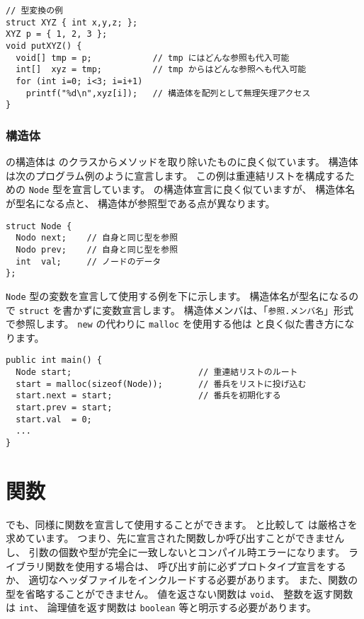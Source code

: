 \begin{mylist}
\begin{verbatim}
// 型変換の例
struct XYZ { int x,y,z; };
XYZ p = { 1, 2, 3 };
void putXYZ() {
  void[] tmp = p;            // tmp にはどんな参照も代入可能
  int[]  xyz = tmp;          // tmp からはどんな参照へも代入可能
  for (int i=0; i<3; i=i+1)
    printf("%d\n",xyz[i]);   // 構造体を配列として無理矢理アクセス
}
\end{verbatim}
\end{mylist}

\subsubsection{構造体}

\label{chap3:struct}
\cmml の構造体は \javal のクラスからメソッドを取り除いたものに良く似ています。
構造体は次のプログラム例のように宣言します。
この例は重連結リストを構成するための \verb/Node/ 型を宣言しています。
\cl の構造体宣言に良く似ていますが、
構造体名が型名になる点と、
構造体が参照型である点が異なります。

\begin{mylist}
\begin{verbatim}
struct Node {
  Nodo next;    // 自身と同じ型を参照
  Nodo prev;    // 自身と同じ型を参照
  int  val;     // ノードのデータ
};
\end{verbatim}
\end{mylist}

\verb/Node/ 型の変数を宣言して使用する例を下に示します。
構造体名が型名になるので \verb/struct/ を書かずに変数宣言します。
構造体メンバは、「\verb/参照.メンバ名/」形式で参照します。
\verb/new/ の代わりに \verb/malloc/ を使用する他は
\javal と良く似た書き方になります。

\begin{mylist}
\begin{verbatim}
public int main() {
  Node start;                         // 重連結リストのルート
  start = malloc(sizeof(Node));       // 番兵をリストに投げ込む
  start.next = start;                 // 番兵を初期化する
  start.prev = start;
  start.val  = 0;
  ...
}
\end{verbatim}
\end{mylist}

\section{関数}
\label{chap3:func}
\cmml でも、\cl 同様に関数を宣言して使用することができます。
\cl と比較して \cmml は厳格さを求めています。
つまり、先に宣言された関数しか呼び出すことができませんし、
引数の個数や型が完全に一致しないとコンパイル時エラーになります。
ライブラリ関数を使用する場合は、
呼び出す前に必ずプロトタイプ宣言をするか、
適切なヘッダファイルをインクルードする必要があります。
また、関数の型を省略することができません。
値を返さない関数は \verb/void/、
整数を返す関数は \verb/int/、
論理値を返す関数は \verb/boolean/ 等と明示する必要があります。


